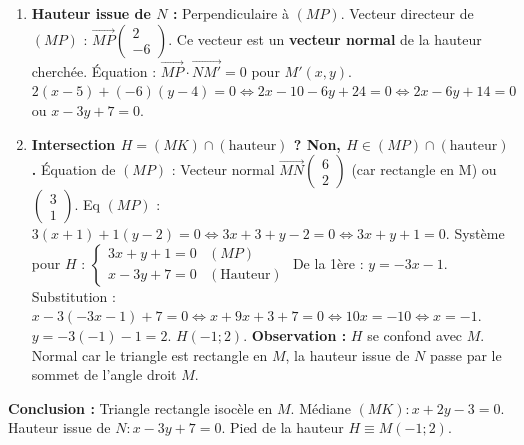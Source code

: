 \documentclass[11pt]{article}
\begin{document}
\begin{exoresolu}
\begin{enumerate}
        Un vecteur normal est $\vec{n}\begin{pmatrix} 1 \\ 2 \end{pmatrix}$ (car $2\times1 + (-1)\times2 = 0$).
        Équation cartésienne : $\vec{n}\cdot\overrightarrow{MM'}=0$ pour $M'(x,y)$.
        $1(x-(-1)) + 2(y-2) = 0 \iff x+1+2y-4=0 \iff \boxed{x + 2y - 3 = 0}$.
        \item \textbf{Hauteur issue de $N$ :} Perpendiculaire à $(MP)$. Vecteur directeur de $(MP)$ : $\overrightarrow{MP}\begin{pmatrix} 2 \\ -6 \end{pmatrix}$.
        Ce vecteur est un \textbf{vecteur normal} de la hauteur cherchée.
        Équation : $\overrightarrow{MP}\cdot\overrightarrow{NM'}=0$ pour $M'(x,y)$.
        $2(x-5) + (-6)(y-4) = 0 \iff 2x-10 -6y+24 = 0 \iff \boxed{2x - 6y + 14 = 0}$ ou $\boxed{x - 3y + 7 = 0}$.
        \item \textbf{Intersection $H = (MK) \cap (\text{hauteur})$ ? Non, $H \in (MP) \cap (\text{hauteur})$.}
        Équation de $(MP)$ : Vecteur normal $\overrightarrow{MN}\begin{pmatrix} 6 \\ 2 \end{pmatrix}$ (car rectangle en M) ou $\begin{pmatrix} 3 \\ 1 \end{pmatrix}$.
        Eq $(MP)$ : $3(x+1) + 1(y-2) = 0 \iff 3x+3+y-2=0 \iff \boxed{3x + y + 1 = 0}$.
        Système pour $H$ :
        $\begin{cases} 3x + y + 1 = 0 & (MP) \\ x - 3y + 7 = 0 & (\text{Hauteur}) \end{cases}$
        De la 1ère : $y = -3x - 1$.
        Substitution : $x - 3(-3x-1) + 7 = 0 \iff x + 9x + 3 + 7 = 0 \iff 10x = -10 \iff x = -1$.
        $y = -3(-1)-1 = 2$.
        $H(-1;2)$.
        \textbf{Observation :} $H$ se confond avec $M$. Normal car le triangle est rectangle en $M$, la hauteur issue de $N$ passe par le sommet de l'angle droit $M$.
    \end{enumerate}
    \textbf{Conclusion :} Triangle rectangle isocèle en $M$. Médiane $(MK): x+2y-3=0$. Hauteur issue de $N: x-3y+7=0$. Pied de la hauteur $H \equiv M(-1;2)$.
\end{exoresolu}
\end{document}
